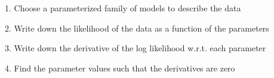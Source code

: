 \documentclass{article}
\begin{document}
\begin{huge}
1. Choose a parameterized family of models to describe the data\\

2. Write down the likelihood of the data as a function of the parameters\\

3. Write down the derivative of the log likelihood w.r.t. each parameter

4. Find the parameter values such that the derivatives are zero\\



\end{huge}
\end{document}
